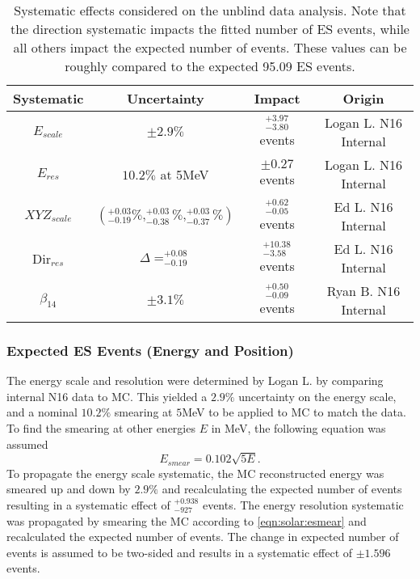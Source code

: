 \begin{table}[]
\begin{center}
\begin{tabular}{c|c|c|c}
Systematic & Uncertainty & Impact & Origin \\ \hline
$E_{scale}$     & $\pm 2.9\%$ & $^{+3.97}_{-3.80}$ events & Logan L. N16 Internal \rule{0pt}{2.6ex}\rule[-1.2ex]{0pt}{0pt}  \\
$E_{res}$       & $10.2\%$ at 5MeV & $\pm0.27$ events & Logan L. N16 Internal  \rule{0pt}{2.6ex}\rule[-1.2ex]{0pt}{0pt}  \\
${XYZ}_{scale}$ & $(^{+0.03}_{-0.19}\%,^{+0.03}_{-0.38}\%,^{+0.03}_{-0.37}\%)$ & $^{+0.62}_{-0.05}$ events & Ed L. N16 Internal  \rule{0pt}{2.6ex}\rule[-1.2ex]{0pt}{0pt}  \\
Dir$_{res}$     &  $\Delta = ^{+0.08}_{-0.19}$ & $^{+10.38}_{-3.58}$ events & Ed L. N16 Internal \rule{0pt}{2.6ex}\rule[-1.2ex]{0pt}{0pt}  \\
$\beta_{14}$ & $\pm 3.1\%$ & $^{+0.50}_{-0.09}$ events & Ryan B. N16 Internal\\ \hline
\end{tabular}
\caption{Systematic effects considered on the unblind data analysis. Note that
    the direction systematic impacts the fitted number of ES events, while
    all others impact the expected number of events. These values can be roughly
    compared to the expected 95.09 ES events.}
\label{tbl:solar:unblind_syst}
\end{center}
\end{table}

\subsubsection{Expected ES Events (Energy and Position)}

The energy scale and resolution were determined by Logan L. by comparing 
internal N16 data to MC. This yielded a $2.9\%$ uncertainty on the energy
scale, and a nominal $10.2\%$ smearing at $5$MeV to be applied to MC to match
the data.
To find the smearing at other energies $E$ in MeV, the following equation was 
assumed
\begin{equation}
\label{eqn:solar:esmear}
E_{smear} = 0.102\sqrt{5 E}.
\end{equation}
To propagate the energy scale systematic, the MC reconstructed energy was 
smeared up and down by $2.9\%$ and recalculating the expected number of events
resulting in  a systematic effect of $^{+0.938}_{-927}$ events. 
The energy resolution systematic was propagated by smearing the MC according to
\ref{eqn:solar:esmear} and recalculated the expected number of events.
The change in expected number of events is assumed to be two-sided and results
in a systematic effect of $\pm1.596$ events.

